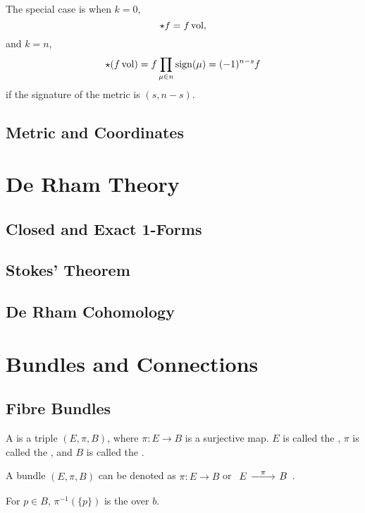 \documentclass[openany, oneside, a5paper]{book}
\begin{document}
The special case is when $k = 0$,
\begin{equation}
    \star f = f \operatorname{vol},
\end{equation}
and $k = n$,
\begin{equation}
    \star (f \operatorname{vol}) = f \prod_{\mu \in n} \operatorname{sign}(\mu) = (-1)^{n - s} f
\end{equation}
if the signature of the metric is $(s, n - s)$.



\section{Metric and Coordinates}

\chapter{De Rham Theory}
\section{Closed and Exact 1-Forms}
\section{Stokes' Theorem}
\section{De Rham Cohomology}

\chapter{Bundles and Connections}
\section{Fibre Bundles}
\begin{definition}[Bundle]
    A  is a triple $(E, \pi, B)$, where $\pi \colon E \to B$ is a surjective map.
    $E$ is called the , $\pi$ is called the , and $B$ is called the .

    A bundle $(E, \pi, B)$ can be denoted as $\pi \colon E \to B$ or $\begin{tikzcd}
        E \arrow[r, "\pi"] & B
    \end{tikzcd}$.
\end{definition}

\begin{definition}[Fibre]
    For $p \in B$, $\pi^{-1}(\{p\})$ is the  over $b$.
\end{definition}
\end{document}
